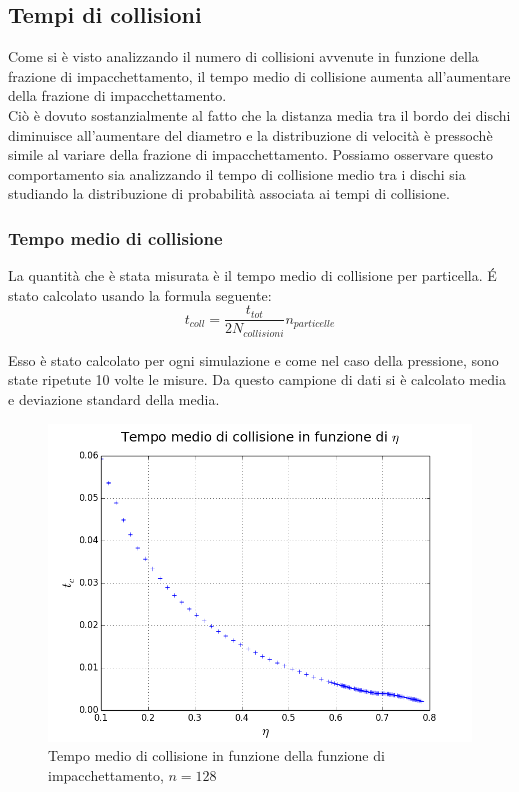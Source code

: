 \subsection{Tempi di collisioni}

Come si è visto analizzando il numero di collisioni avvenute in funzione della frazione di impacchettamento, il tempo medio di collisione aumenta all'aumentare della frazione di impacchettamento.\\
Ciò è dovuto sostanzialmente al fatto che la distanza media tra il bordo dei dischi diminuisce all'aumentare del diametro e la distribuzione di velocità è pressochè simile al variare della frazione di impacchettamento.
Possiamo osservare questo comportamento sia analizzando il tempo di collisione medio tra i dischi sia studiando la distribuzione di probabilità associata ai tempi di collisione.\\

\subsubsection*{Tempo medio di collisione}
La quantità che è stata misurata è il tempo medio di collisione per particella. \'E stato calcolato usando la formula seguente:
$$
	t_{coll}  = \frac{t_{tot}}{2 N_{collisioni}} n_{particelle}
$$

Esso è stato calcolato per ogni simulazione e come nel caso della pressione, sono state ripetute 10 volte le misure. Da questo campione di dati si è calcolato media e deviazione standard della media.


\begin{figure}[h!]
	\centering
	\includegraphics[scale=0.48]{sfere2D/tc.png}
	\caption{Tempo medio di collisione in funzione della funzione di impacchettamento, $n=128$}
	\end{figure}

